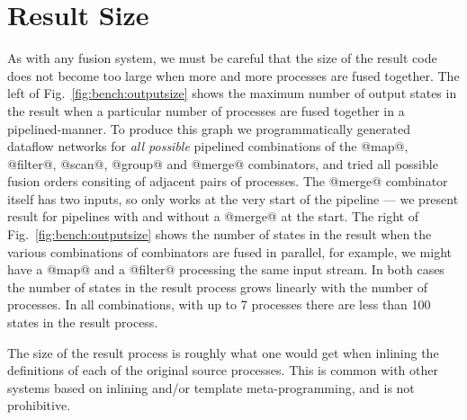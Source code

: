 


\section{Result Size}

As with any fusion system, we must be careful that the size of the result code does not become too large when more and more processes are fused together. The left of Fig.~\ref{fig:bench:outputsize} shows the maximum number of output states in the result when a particular number of processes are fused together in a pipelined-manner. To produce this graph we programmatically generated dataflow networks for \emph{all possible} pipelined combinations of the @map@, @filter@, @scan@, @group@ and @merge@ combinators, and tried all possible fusion orders consiting of adjacent pairs of processes. The @merge@ combinator itself has two inputs, so only works at the very start of the pipeline --- we present result for pipelines with and without a @merge@ at the start. The right of Fig.~\ref{fig:bench:outputsize} shows the number of states in the result when the various combinations of combinators are fused in parallel, for example, we might have a @map@ and a @filter@ processing the same input stream. In both cases the number of states in the result process grows linearly with the number of processes. In all combinations, with up to 7 processes there are less than 100 states in the result process. 

The size of the result process is roughly what one would get when inlining the definitions of each of the original source processes. This is common with other systems based on inlining and/or template meta-programming, and is not prohibitive.

